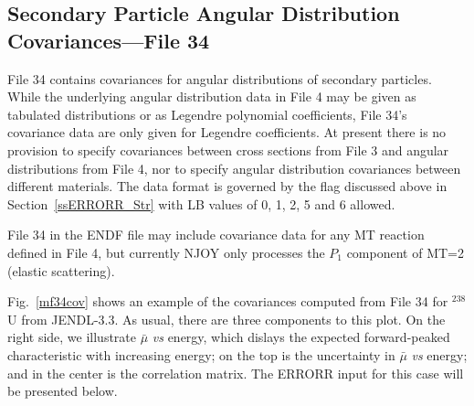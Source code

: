 \subsection{Secondary Particle Angular Distribution Covariances---File 34}
\label{ssERRORR_34}

File 34 contains covariances for angular distributions of secondary
particles.  While the underlying angular distribution data in File 4
may be given as tabulated distributions or as Legendre polynomial
coefficients, File 34's covariance data are only given for Legendre
coefficients.  At present there is no provision to specify covariances
between cross sections from File 3 and angular distributions from
File 4, nor to specify angular distribution covariances between
different materials.  The data format is governed by the 
flag discussed above in Section~\ref{ssERRORR_Str} with LB values
of 0, 1, 2, 5 and 6 allowed.

File 34 in the ENDF file may include covariance data for any MT
reaction defined in File 4, but currently NJOY only processes
the $P_1$ component of MT=2 (elastic scattering).

Fig.~\ref{mf34cov} shows an example of the covariances computed from File 34
for $^{238}$U from JENDL-3.3.  As usual, there are three components to this
plot.  On the right side, we illustrate $\bar{\mu}$ {\it vs} energy, which
dislays the expected forward-peaked characteristic with increasing energy;
on the top is
the uncertainty in $\bar{\mu}$ {\it vs} energy; and in the center is the
correlation matrix.   The ERRORR input for this case will be presented
below.


